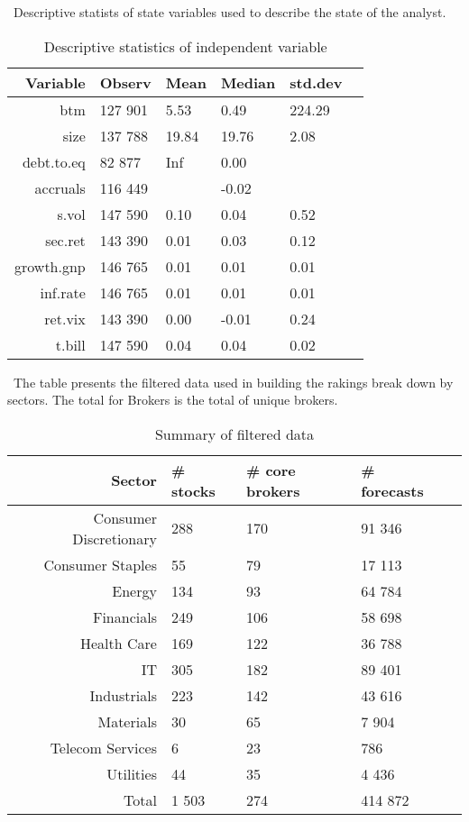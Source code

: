 \documentclass{article}\usepackage[]{graphicx}\usepackage[]{color}
\begin{document}
\begin{table}
\caption{Descriptive statistics of independent variable}
\ Descriptive statists of state variables used to describe the state of the analyst.
\begin{center}
\begin{tabularx}{\linewidth}{r*{5}{Y}}
\toprule
Variable & Observ & Mean & Median & std.dev\\
\midrule 
 btm & 127 901 & 5.53 & 0.49 & 224.29 \\ 
  size & 137 788 & 19.84 & 19.76 & 2.08 \\ 
  debt.to.eq & 82 877 & Inf & 0.00 &  \\ 
  accruals & 116 449 &  & -0.02 &  \\ 
  s.vol & 147 590 & 0.10 & 0.04 & 0.52 \\ 
  sec.ret & 143 390 & 0.01 & 0.03 & 0.12 \\ 
  growth.gnp & 146 765 & 0.01 & 0.01 & 0.01 \\ 
  inf.rate & 146 765 & 0.01 & 0.01 & 0.01 \\ 
  ret.vix & 143 390 & 0.00 & -0.01 & 0.24 \\ 
  t.bill & 147 590 & 0.04 & 0.04 & 0.02 \\ 
  
\bottomrule
\end{tabularx}
\end{center}
\label{tab:ind.vvs}
\end{table}


\begin{table}
\caption{Summary of filtered data}
\ The table presents the filtered data used in building the rakings break down by sectors. The total for Brokers is the total of unique brokers.

\begin{center}
\begin{tabularx}{\linewidth}{r*{4}{Y}}
\toprule
Sector & \# stocks & \# core brokers & \# forecasts \\ 
\midrule
 Consumer Discretionary & 288 & 170 & 91 346 \\ 
  Consumer Staples &  55 &  79 & 17 113 \\ 
  Energy & 134 &  93 & 64 784 \\ 
  Financials & 249 & 106 & 58 698 \\ 
  Health Care & 169 & 122 & 36 788 \\ 
  IT & 305 & 182 & 89 401 \\ 
  Industrials & 223 & 142 & 43 616 \\ 
  Materials &  30 &  65 & 7 904 \\ 
  Telecom Services &   6 &  23 & 786 \\ 
  Utilities &  44 &  35 & 4 436 \\ 
   \midrule 
Total & 1 503 & 274 & 414 872 \\ 
  
\bottomrule
\end{tabularx}
\label{table:filtered.summary}
\end{center}
\end{table}
\end{document}
